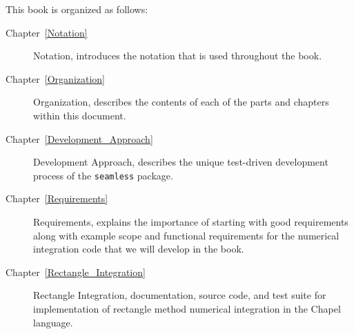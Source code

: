 \label{Organization}

This book is organized as follows:

\begin{description}

\item[Chapter~\ref{Notation}] Notation, introduces the notation that is used
throughout the book.


\item[Chapter~\ref{Organization}] Organization, describes the contents of
each of the parts and chapters within this document.

\item[Chapter~\ref{Development_Approach}] Development Approach, describes 
the unique test-driven development process of the \lstinline{seamless} package.

\item[Chapter~\ref{Requirements}] Requirements, explains the importance of starting
with good requirements along with example scope and functional requirements for 
the numerical integration code that we will develop in the book.

\item[Chapter~\ref{Rectangle_Integration}] Rectangle Integration, documentation, source
code, and test suite for implementation of rectangle method numerical integration 
in the Chapel language.

\end{description}
